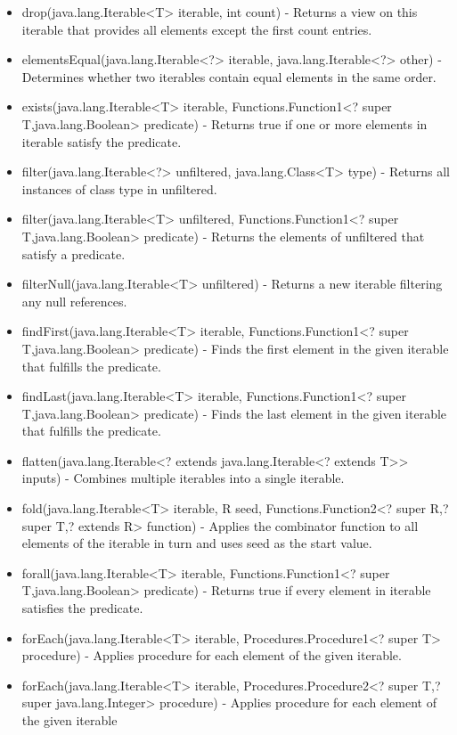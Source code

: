 \begin{itemize}
	\item drop(java.lang.Iterable<T> iterable, int count) - Returns a view on this iterable that provides all elements except the first count entries.
	\item elementsEqual(java.lang.Iterable<?> iterable, java.lang.Iterable<?> other) - Determines whether two iterables contain equal elements in the same order.
	\item exists(java.lang.Iterable<T> iterable, Functions.Function1<? super T,java.lang.Boolean> predicate) - Returns true if one or more elements in iterable satisfy the predicate.
	\item filter(java.lang.Iterable<?> unfiltered, java.lang.Class<T> type) - Returns all instances of class type in unfiltered.
	\item filter(java.lang.Iterable<T> unfiltered, Functions.Function1<? super T,java.lang.Boolean> predicate) - Returns the elements of unfiltered that satisfy a predicate.
	\item filterNull(java.lang.Iterable<T> unfiltered) - Returns a new iterable filtering any null references.
	\item findFirst(java.lang.Iterable<T> iterable, Functions.Function1<? super T,java.lang.Boolean> predicate) - Finds the first element in the given iterable that fulfills the predicate.
	\item findLast(java.lang.Iterable<T> iterable, Functions.Function1<? super T,java.lang.Boolean> predicate) - Finds the last element in the given iterable that fulfills the predicate.
	\item flatten(java.lang.Iterable<? extends java.lang.Iterable<? extends T>> inputs) - Combines multiple iterables into a single iterable.
	\item fold(java.lang.Iterable<T> iterable, R seed, Functions.Function2<? super R,? super T,? extends R> function) - Applies the combinator function to all elements of the iterable in turn and uses seed as the start value.
	\item forall(java.lang.Iterable<T> iterable, Functions.Function1<? super T,java.lang.Boolean> predicate) - Returns true if every element in iterable satisfies the predicate.
	\item forEach(java.lang.Iterable<T> iterable, Procedures.Procedure1<? super T> procedure) - Applies procedure for each element of the given iterable.
	\item forEach(java.lang.Iterable<T> iterable, Procedures.Procedure2<? super T,? super java.lang.Integer> procedure) - Applies procedure for each element of the given iterable

\end{itemize}
